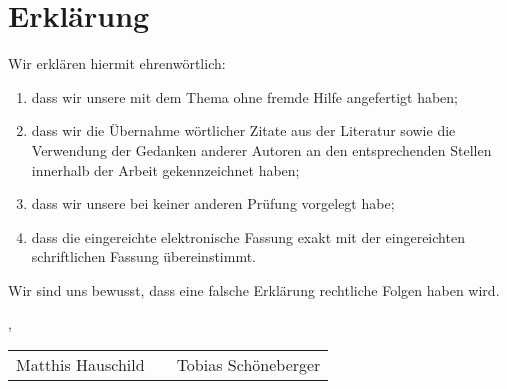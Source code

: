 \thispagestyle{empty}

\section*{Erklärung}
\vspace*{2em}

Wir erklären hiermit ehrenwörtlich: \\
\begin{enumerate}
\item dass wir unsere {\arbeitsart} mit dem Thema
{\itshape \titel } ohne fremde Hilfe angefertigt haben;
\item dass wir die Übernahme wörtlicher Zitate aus der Literatur sowie die
Verwendung der Gedanken anderer Autoren an den entsprechenden Stellen innerhalb
der Arbeit gekennzeichnet haben;
\item dass wir unsere {\arbeitsart} bei keiner anderen Prüfung vorgelegt habe;
\item dass die eingereichte elektronische Fassung exakt mit der eingereichten schriftlichen Fassung
übereinstimmt.
\end{enumerate}

Wir sind uns bewusst, dass eine falsche Erklärung rechtliche Folgen haben wird.

\vspace{3em}

\abgabeort, \datumAbgabe
\vspace{6em}

\begin{tabular}[h]{p{5cm} p{2cm} p{5cm}}
  \hline
	Matthis Hauschild & &Tobias Schöneberger \\
\end{tabular} 
